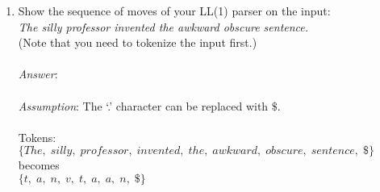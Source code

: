 \documentclass[fleqn]{article}
\begin{document}
\begin{enumerate}
  \item Show the sequence of moves of your LL(1) parser on the input:\\
  \textit{The silly professor invented the awkward obscure sentence.}\\
  (Note that you need to tokenize the input first.)\\\\
  \textit{Answer}:\\\\
  \textit{Assumption}: The `.' character can be replaced with $\$$.\\\\
  Tokens: $\{The, \; silly, \; professor, \; invented, \; the, \; awkward, \; obscure, \; sentence, \; \$\}$ becomes\\
  $\{t, \; a, \; n, \; v, \; t, \; a, \; a, \; n, \; \$\}$\\


\end{enumerate}
\end{document}
